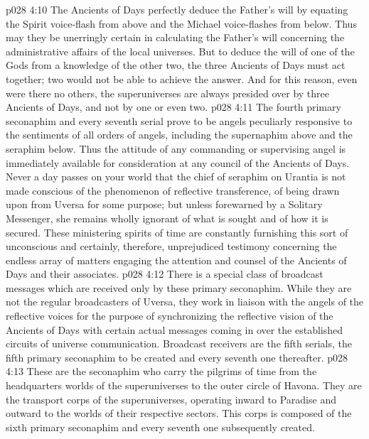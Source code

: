 \vs p028 4:10 The Ancients of Days perfectly deduce the Father’s will by equating the Spirit voice\hyp{}flash from above and the Michael voice\hyp{}flashes from below. Thus may they be unerringly certain in calculating the Father’s will concerning the administrative affairs of the local universes. But to deduce the will of one of the Gods from a knowledge of the other two, the three Ancients of Days must act together; two would not be able to achieve the answer. And for this reason, even were there no others, the superuniverses are always presided over by three Ancients of Days, and not by one or even two.
\pc \vs p028 4:11 \bibnobreakspace {} The fourth primary seconaphim and every seventh serial prove to be angels peculiarly responsive to the sentiments of all orders of angels, including the supernaphim above and the seraphim below. Thus the attitude of any commanding or supervising angel is immediately available for consideration at any council of the Ancients of Days. Never a day passes on your world that the chief of seraphim on Urantia is not made conscious of the phenomenon of reflective transference, of being drawn upon from Uversa for some purpose; but unless forewarned by a Solitary Messenger, she remains wholly ignorant of what is sought and of how it is secured. These ministering spirits of time are constantly furnishing this sort of unconscious and certainly, therefore, unprejudiced testimony concerning the endless array of matters engaging the attention and counsel of the Ancients of Days and their associates.
\pc \vs p028 4:12 \bibnobreakspace {} There is a special class of broadcast messages which are received only by these primary seconaphim. While they are not the regular broadcasters of Uversa, they work in liaison with the angels of the reflective voices for the purpose of synchronizing the reflective vision of the Ancients of Days with certain actual messages coming in over the established circuits of universe communication. Broadcast receivers are the fifth serials, the fifth primary seconaphim to be created and every seventh one thereafter.\plusone
\pc \vs p028 4:13 \bibnobreakspace {} These are the seconaphim who carry the pilgrims of time from the headquarters worlds of the superuniverses to the outer circle of Havona. They are the transport corps of the superuniverses, operating inward to Paradise and outward to the worlds of their respective sectors. This corps is composed of the sixth primary seconaphim and every seventh one subsequently created.
